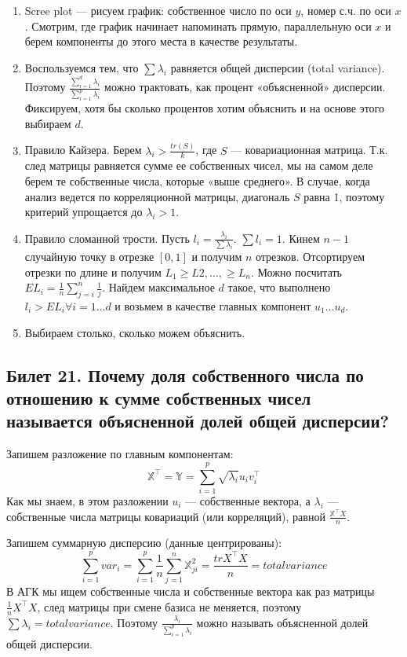 \begin{enumerate}
\item Scree plot — рисуем график: собственное число по оси $y$, номер с.ч. по оси $x$. Смотрим, где график начинает напоминать прямую, параллельную оси $x$ и берем компоненты до этого места в качестве результаты.
\item Воспользуемся тем, что $\sum \lambda_i$ равняется общей дисперсии (total variance). Поэтому 
$\frac{\sum_{i=1}^{d} \lambda_i}{\sum_{i=1}^{p}\lambda_i}$ можно трактовать, как процент «объясненной» дисперсии. Фиксируем, хотя бы сколько процентов хотим объяснить и на основе этого выбираем $d$.
\item Правило Кайзера. Берем $\lambda_i > \frac{tr(S)}{k}$, где $S$ — ковариационная матрица. Т.к. след матрицы равняется сумме ее собственных чисел, мы на самом деле берем те собственные числа, которые «выше среднего». 
В случае, когда анализ ведется по корреляционной матрицы, диагональ $S$ равна 1, поэтому критерий упрощается до $\lambda_i > 1$. 
\item Правило сломанной трости. Пусть $l_i = \frac{\lambda_i}{\sum\lambda_i}$. $\sum l_i = 1$. Кинем $n-1$ случайную точку в отрезке $[0,1]$ и получим $n$ отрезков. Отсортируем отрезки по длине и получим $L_1 \geq L2,…,\geq L_n$. Можно посчитать $EL_i = \frac{1}{n}\sum\limits_{j=i}^{n} \frac{1}{j}$. 
Найдем максимальное $d$  такое, что выполнено $l_i > EL_i \forall i = 1…d$ и возьмем в качестве главных компонент $u_1…u_d$. 
\item Выбираем столько, сколько можем объяснить.  
\end{enumerate} 

\subsection{Билет 21. Почему доля собственного числа по отношению к сумме собственных чисел называется
объясненной долей общей дисперсии?}
Запишем разложение по главным компонентам:
$$ \mathbb{X}^{\intercal}=\mathbb{Y} = \sum \limits_{i=1}^{p} \sqrt{\lambda_i}u_iv_i^{\intercal}$$
Как мы знаем, в этом разложении $u_i$ — собственные вектора, а $\lambda_i$ — собственные числа матрицы ковариаций (или корреляций), равной $\frac{\mathbb{X}^{\intercal}X}{n}$.

Запишем суммарную дисперсию (данные центрированы):
$$ \sum_{i=1}^{p} var_i= \sum_{i=1}^{p} \frac{1}{n}\sum_{j=1}^{n}\mathbb{X}_{ji}^2 = \frac{tr{X^{\intercal}X}}{n} = total variance$$
В АГК мы ищем собственные числа и собственные вектора как раз матрицы $\frac{1}{n}X^{\intercal}X$, след матрицы при смене базиса не меняется, поэтому $\sum \lambda_i = total variance$. 
Поэтому $\frac{\lambda_i}{\sum\limits_{i=1}^{p}\lambda_i}$ можно называть объясненной долей общей дисперсии. 
